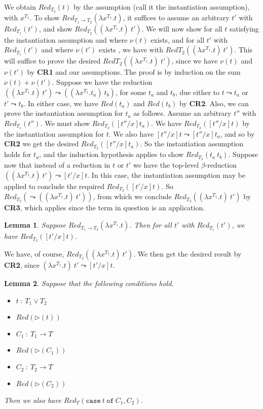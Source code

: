 \documentclass{article}
\newcommand{\red}[0]{\textit{Red}}
\newcommand{\redsub}[1]{\textit{Red}(\rhd(#1))}
\newtheorem{lemma}{Lemma}
\begin{document}
\noindent We obtain $\red_{T_2}(t)$ by the assumption (call it the
instantiation assumption), with $x^{T_1}$.  To show $\red_{T_1\to
T_2}(\lambda x^{T_1}.t)$, it suffices to assume an arbitrary $t'$ with
$\red_{T_1}(t')$, and show $\red_{T_2}((\lambda x^{T_1}.t)\ t')$.  We
will now show for all $t$ satisfying the instantiation assumption and
where $\nu(t)$ exists, and for all $t'$ with $\red_{T_1}(t')$ and
where $\nu(t')$ exists , we have with $\red{T_2}((\lambda x^{T_1}.t)\
t')$.  This will suffice to prove the desired $\red{T_2}((\lambda
x^{T_1}.t)\ t')$, since we have $\nu(t)$ and $\nu(t')$ by \textbf{CR1}
and our assumptions.  The proof is by induction on the sum
$\nu(t)+\nu(t')$.  Suppose we have the reduction $((\lambda
x^{T_1}.t)\ t')\leadsto ((\lambda x^{T_1}. t_a)\ t_b)$, for some $t_a$
and $t_b$, due either to $t\leadsto t_a$ or $t' \leadsto t_b$.  In
either case, we have $\red(t_a)$ and $\red(t_b)$ by \textbf{CR2}.
Also, we can prove the instantiation assumption for $t_a$ as follows.
Assume an arbitrary $t''$ with $\red_{T_1}(t'')$.  We must show
$\red_{T_2}([t''/x]t_a)$.  We have $\red_{T_2}([t''/x]t)$ by the
instantiation assumption for $t$.  We also have $[t''/x]t \leadsto
[t''/x]t_a$, and so by \textbf{CR2} we get the desired
$\red_{T_2}([t''/x]t_a)$.  So the instantiation assumption holds for
$t_a$, and the induction hypothesis applies to show $\red_{T_2}(t_a\
t_b)$.  Suppose now that instead of a reduction in $t$ or $t'$ we have
the top-level $\beta$-reduction $((\lambda x^{T_1}.t)\ t')\leadsto
[t'/x]t$.  In this case, the instantiation assumption may be applied
to conclude the required $\red_{T_2}([t'/x]t)$.  So
$\red_{T_2}(\leadsto((\lambda x^{T_1}.t)\ t'))$, from which we
conclude $\red_{T_2}((\lambda x^{T_1}.t)\ t')$ by \textbf{CR3}, which
applies since the term in question is an application.

\begin{lemma}
\label{lem:red-inst}
Suppose $\red_{T_1\to T_2}(\lambda x^{T_1}.t)$.  Then for all
$t'$ with $\red_{T_1}(t')$, we have $\red_{T_2}([t'/x]t)$.
\end{lemma}

\noindent We have, of course, $\red_{T_2}((\lambda x^{T_1}.t)\ t')$.
We then get the desired result by \textbf{CR2}, since $(\lambda
x^{T_1}.t)\ t'\leadsto [t'/x]t$.

\begin{lemma}
Suppose that the following conditions hold.
\begin{itemize} 
\item $t\ :\ T_1\vee T_2$
\item $\redsub{t}$
\item $C_1\ :\ T_1\to T$
\item $\redsub{C_1}$
\item $C_2\ :\ T_2\to T$
\item $\redsub{C_2}$
\end{itemize}
Then we also have $\red_{T}(\texttt{case}\ t\ \texttt{of}\ C_1,C_2)$.
\end{lemma}
\end{document}
